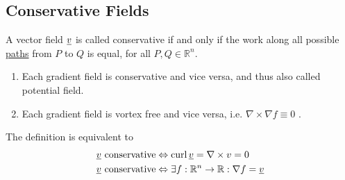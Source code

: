 \subsection*{Conservative Fields}
A vector field $\underline{v}$ is called conservative if and only if the work along all possible \ul{paths} from $P$ to $Q$ is equal, for all $P, Q \in \mathbb{R}^n$.

\begin{comment}
The work does not depend on the specific path chosen, but only on the starting point and end point.
These points ($P$ and $Q$ above) are hence states of the system, which we earlier identified with the levels of the reservoirs.
For a conserved quantity, it does hence not matter how the level of a reservoir is reached, but only how large it is.
\end{comment}

\begin{enumerate}
	[label=$\bullet$]
	\item Each gradient field is conservative and vice versa, and thus also called potential field. 
	\item Each gradient field is vortex free and vice versa, i.e. $\nabla \times \nabla f \equiv 0$ .
\end{enumerate}


The definition is equivalent to
\[
\begin{aligned}
	\underline{v} \text{ conservative} &\Leftrightarrow \operatorname*{curl} \underline{v} = \nabla \times v = 0 \\
	\underline{v} \text{ conservative} &\Leftrightarrow \exists f : \mathbb{R}^n \to \mathbb{R} : \nabla f = \underline{v} \\
\end{aligned}
\]









